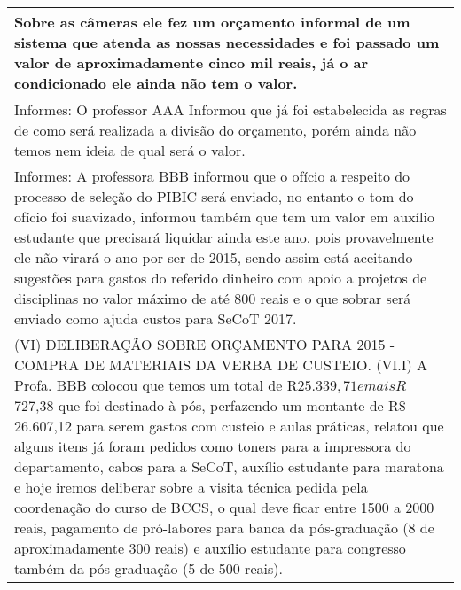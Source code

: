 
\begin{longtable}{|p{17.5cm}|}
\hline 
Sobre as câmeras ele fez um orçamento informal de um sistema que atenda as nossas necessidades e foi passado um valor de aproximadamente cinco mil reais, já o ar condicionado ele ainda não tem o valor.

 \\ \hline 
Informes: O professor AAA Informou que já foi estabelecida as regras de como será realizada a divisão do orçamento, porém ainda não temos nem ideia de qual será o valor.

 \\ \hline 
Informes: A professora BBB informou que o ofício a respeito do processo de seleção do PIBIC será enviado, no entanto o tom do ofício foi suavizado, informou também que tem um valor em auxílio estudante que precisará liquidar ainda este ano, pois provavelmente ele não virará o ano por ser de 2015, sendo assim está aceitando sugestões para gastos do referido dinheiro com apoio a projetos de disciplinas no valor máximo de até 800 reais e o que sobrar será enviado como ajuda custos para SeCoT 2017.

 \\ \hline 
(VI) DELIBERAÇÃO SOBRE ORÇAMENTO PARA 2015 - COMPRA DE MATERIAIS DA VERBA DE CUSTEIO. (VI.I) A Profa. BBB colocou que temos um total de R$ 25.339,71 e mais R$ 727,38 que foi destinado à pós, perfazendo um montante de R\$ 26.607,12 para serem gastos com custeio e aulas práticas, relatou que alguns itens já foram pedidos como toners para a impressora do departamento, cabos para a SeCoT, auxílio estudante para maratona e hoje iremos deliberar sobre a visita técnica pedida pela coordenação do curso de BCCS, o qual deve ficar entre 1500 a 2000 reais, pagamento de pró-labores para banca da pós-graduação (8 de aproximadamente 300 reais) e auxílio estudante para congresso também da pós-graduação (5 de 500 reais).


\end{longtable}
